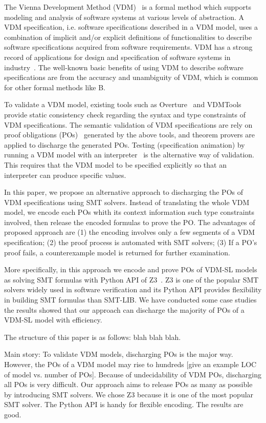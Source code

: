 The Vienna Development Method (VDM)~\cite{Jones:1990:SSD:94062,Fitzgerald:2005:VDO:1044891,Fitz:PGLarson:2009book} is a formal method which supports modeling and analysis of software systems at various levels of abstraction. A VDM specification, i.e. software specifications described in a VDM model, uses a combination of implicit and/or explicit definitions of functionalities to describe software specifications acquired from software requirements. VDM has a strong record of applications for design and specification of software systems in industry~\cite{Larsen:2007:RIA:2227886.2227894,DBLP:conf/fm/KuritaCN08,DBLP:journals/ijsi/KuritaN09}. The well-known basic benefits of using VDM to describe software specifications are from the accuracy and unambiguity of VDM, which is common for other formal methods like B. 

To validate a VDM model, existing tools such as Overture~\cite{Larsen:2010:OII:1668862.1668864} and VDMTools provide static consistency check regarding the syntax and type constraints of VDM specifications. The semantic validation of VDM specifications are rely on proof obligations (POs)~\cite{AL:97:POGV} generated by the above tools, and theorem provers are applied to discharge the generated POs. Testing (specification animation) by running a VDM model with an interpreter~\cite{Prehn:1991:LNCS551} is the alternative way of validation. This requires that the VDM model to be specified explicitly so that an interpreter can produce specific values.


In this paper, we propose an alternative approach to discharging the POs of VDM specifications using SMT solvers. Instead of translating the whole VDM model, we encode each POs whith its context information such type constraints involved, then release the encoded formulas to prove the PO. The advantages of proposed approach are (1) the encoding involves only a few segments of a VDM specification; (2) the proof process is automated with SMT solvers; (3) If a PO's proof fails, a counterexample model is returned for further examination. 

More specifically, in this approach we encode and prove POs of VDM-SL models as solving SMT formulas with Python API of Z3~\cite{MB:08:ZSS}. Z3 is one of the popular SMT solvers widely used in software verification and its Python API provides flexibility in building SMT formulas than SMT-LIB. We have conducted some case studies the results showed that our approach can discharge the majority of POs of a VDM-SL model with efficiency. 

The structure of this paper is as follows: blah blah blah.

Main story: To validate VDM models, discharging POs is the major way. However, the POs of a VDM model may rise to hundreds [give an example LOC of model vs. number of POs]. Because of undecidability of VDM POs, discharging all POs is very difficult. Our approach aims to release POs as many as possible by introducing SMT solvers. We chose Z3 because it is one of the most popular SMT solver. The Python API is handy for flexible encoding. The results are good.
